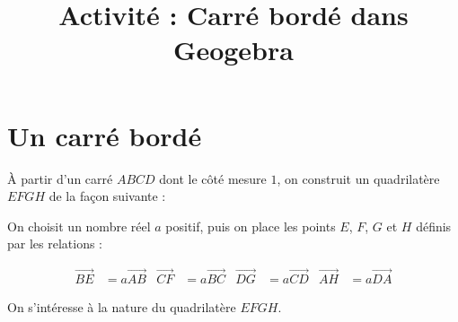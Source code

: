 \documentclass[
	classe=$2^{de}$
]{informatique}
\title{Activité : Carré bordé dans Geogebra}
\begin{document}
\maketitle

\section*{Un carré bordé}

À partir d'un carré $ABCD$ dont le côté mesure $1$, on construit un quadrilatère $EFGH$ de la façon suivante :

On choisit un nombre réel $a$ positif, puis on place les points $E$, $F$, $G$ et $H$ définis par les relations :

\begin{align*}
	\vec{BE} & = a\vec{AB} & \vec{CF} & = a\vec{BC} & \vec{DG} & = a\vec{CD} & \vec{AH} & = a\vec{DA}
\end{align*}

On s'intéresse à la nature du quadrilatère $EFGH$.
\end{document}

